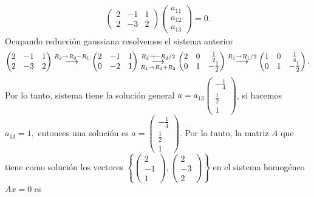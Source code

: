 \documentclass[11pt,letterpaper]{article}
\newcommand{\grstep}[2][\relax]{%
   \ensuremath{\mathrel{
       {\mathop{\longrightarrow}\limits^{#2\mathstrut}_{
                                     \begin{subarray}{l} #1 \end{subarray}}}}}}
\begin{document}
\begin{enumerate}
\begin{align*}
\begin{pmatrix}
2 & -1 & 1\\
2 & -3 & 2
\end{pmatrix}\begin{pmatrix}
a_{11}\\
a_{12}\\
a_{13}
\end{pmatrix}=0.
\end{align*}
Ocupando reducción gaussiana resolvemos el sistema anterior
\begin{align*}
\begin{pmatrix}
2 & -1 & 1\\
2 & -3 & 2
\end{pmatrix}%
\grstep[]{R_2 \rightarrow R_2-R_1}
%
\begin{pmatrix}
2 & -1 & 1\\
0 & -2 & 1
\end{pmatrix}%
\grstep[R_1 \rightarrow R_1+R_2]{R_2 \rightarrow -R_2/2}
%
\begin{pmatrix}
2 & 0 & \frac{1}{2}\\
0 & 1 & -\frac{1}{2}
\end{pmatrix}%
\grstep[]{R_1 \rightarrow R_1/2}
%
\begin{pmatrix}
1 & 0 & \frac{1}{4}\\
0 & 1 & -\frac{1}{2}
\end{pmatrix}.
\end{align*}
Por lo tanto, sistema tiene la solución general $a=a_{13}\begin{pmatrix}
-\frac{1}{4}\\
\frac{1}{2}\\
1
\end{pmatrix}$, si hacemos $a_{13}=1,$ entonces una solución es $a=\begin{pmatrix}
-\frac{1}{4}\\
\frac{1}{2}\\
1
\end{pmatrix}$.
Por lo tanto, la matriz $A$ que tiene como solución los vectores $\left\{\begin{pmatrix}
2\\
-1\\
1
\end{pmatrix},\begin{pmatrix}
2\\
-3\\
2
\end{pmatrix}\right\}$ en el sistema homogéneo $Ax=0$  es 

\end{enumerate}
\end{document}
